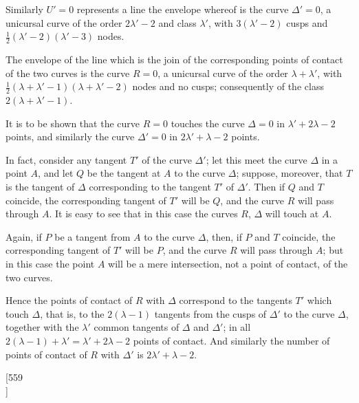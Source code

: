 \documentclass[12pt,a4paper]{article}
\theoremstyle{plain}
\theoremstyle{definition}
\begin{document}
Similarly $U' = 0$ represents a line the envelope whereof is the curve $\Delta' = 0$, a unicursal curve of the order $2\lambda' - 2$ and class $\lambda'$, with $3(\lambda' - 2)$ cusps and $\tfrac{1}{2}(\lambda' - 2)(\lambda' - 3)$ nodes.

\newpage
\setcounter{page}{17}

The envelope of the line which is the join of the corresponding points of contact of the two curves is the curve $R = 0$, a unicursal curve of the order $\lambda + \lambda'$, with $\tfrac{1}{2}(\lambda + \lambda' - 1)(\lambda + \lambda' - 2)$ nodes and no cusps; consequently of the class $2(\lambda + \lambda' - 1)$.

It is to be shown that the curve $R = 0$ touches the curve $\Delta = 0$ in $\lambda' + 2\lambda - 2$ points, and similarly the curve $\Delta' = 0$ in $2\lambda' + \lambda - 2$ points.

In fact, consider any tangent $T'$ of the curve $\Delta'$; let this meet the curve $\Delta$ in a point $A$, and let $Q$ be the tangent at $A$ to the curve $\Delta$; suppose, moreover, that $T$ is the tangent of $\Delta$ corresponding to the tangent $T'$ of $\Delta'$. Then if $Q$ and $T$ coincide, the corresponding tangent of $T'$ will be $Q$, and the curve $R$ will pass through $A$. It is easy to see that in this case the curves $R$, $\Delta$ will touch at $A$.

Again, if $P$ be a tangent from $A$ to the curve $\Delta$, then, if $P$ and $T$ coincide, the corresponding tangent of $T'$ will be $P$, and the curve $R$ will pass through $A$; but in this case the point $A$ will be a mere intersection, not a point of contact, of the two curves.

Hence the points of contact of $R$ with $\Delta$ correspond to the tangents $T'$ which touch $\Delta$, that is, to the $2(\lambda - 1)$ tangents from the cusps of $\Delta'$ to the curve $\Delta$, together with the $\lambda'$ common tangents of $\Delta$ and $\Delta'$; in all $2(\lambda - 1) + \lambda' = \lambda' + 2\lambda - 2$ points of contact. And similarly the number of points of contact of $R$ with $\Delta'$ is $2\lambda' + \lambda - 2$.


\newpage
\setcounter{page}{18}

\begin{center}
[559\\
]
\end{center}
\end{document}
